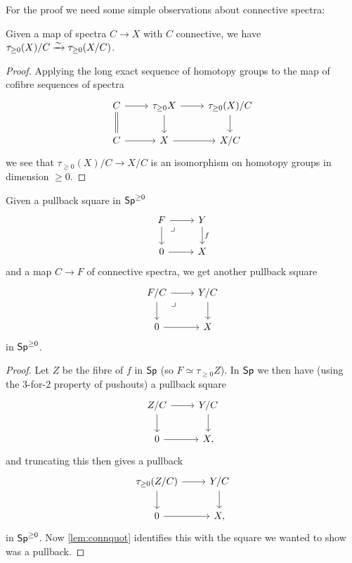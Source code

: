 \documentclass[a4paper,11pt]{article}
\begin{document}
For the proof we need some simple observations about connective spectra:
\begin{lemma}\label{lem:connquot}
  Given a map of spectra $C \to X$ with $C$ connective, we have
  $\tau_{\geq 0}(X)/C \isoto \tau_{\geq 0}(X/C)$.
\end{lemma}
\begin{proof}
  Applying the long exact sequence of homotopy groups to the map of
  cofibre sequences of spectra
  \[
    \begin{tikzcd}
      C \ar[r] \ar[d, equals] & \tau_{\geq 0}X \ar[d] \ar[r]
        & \tau_{\geq 0}(X)/C \ar[d] \\
      C \ar[r] & X \ar[r] & X/C
    \end{tikzcd}
  \]
  we see that $\tau_{\geq 0}(X)/C \to X/C$ is an isomorphism on
  homotopy groups in dimension $\geq 0$.
\end{proof}

\begin{lemma}\label{lem:conn sp pullback}
  Given a pullback square in $\textup{\textsf{Sp}}^{\geq 0}$
  \[
    \begin{tikzcd}
     F \ar[r] \ar[d] \drpullback & Y  \ar[d, "f"] \\
     0 \ar[r] & X
    \end{tikzcd}
  \]
  and a map $C \to F$ of connective spectra, we get another pullback
  square
  \[
    \begin{tikzcd}
     F/C \ar[r] \ar[d] \drpullback & Y/C  \ar[d] \\
     0 \ar[r] & X
    \end{tikzcd}
  \]
  in $\textup{\textsf{Sp}}^{\geq 0}$.
\end{lemma}
\begin{proof}
  Let $Z$ be the fibre of $f$ in $\textup{\textsf{Sp}}$ (so $F \simeq \tau_{\geq
    0}Z$). In $\textup{\textsf{Sp}}$ we then have (using the 3-for-2 property of pushouts) a
  pullback square
  \[
    \begin{tikzcd}
     Z/C \ar[r] \ar[d] & Y/C  \ar[d] \\
     0 \ar[r] & X,
    \end{tikzcd}
  \]
  and truncating this then gives a pullback
  \[
    \begin{tikzcd}
     \tau_{\geq 0}(Z/C) \ar[r] \ar[d] & Y/C  \ar[d] \\
     0 \ar[r] & X,
    \end{tikzcd}
  \]
  in $\textup{\textsf{Sp}}^{\geq 0}$. Now \cref{lem:connquot} identifies this with the
  square we wanted to show was a pullback.
\end{proof}
\end{document}
